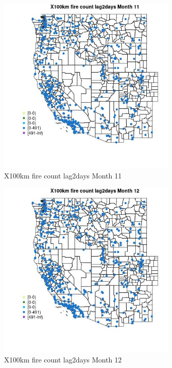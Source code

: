 \begin{figure} 
\centering  
\includegraphics[width=0.77\textwidth]{Code_Outputs/Report_ML_input_PM25_Step4_part_e_de_duplicated_aves_compiled_2019-05-14wNAs_MapObsMo11X100km_fire_count_lag2days.jpg} 
\caption{\label{fig:Report_ML_input_PM25_Step4_part_e_de_duplicated_aves_compiled_2019-05-14wNAsMapObsMo11X100km_fire_count_lag2days}X100km fire count lag2days Month 11} 
\end{figure} 
 

\begin{figure} 
\centering  
\includegraphics[width=0.77\textwidth]{Code_Outputs/Report_ML_input_PM25_Step4_part_e_de_duplicated_aves_compiled_2019-05-14wNAs_MapObsMo12X100km_fire_count_lag2days.jpg} 
\caption{\label{fig:Report_ML_input_PM25_Step4_part_e_de_duplicated_aves_compiled_2019-05-14wNAsMapObsMo12X100km_fire_count_lag2days}X100km fire count lag2days Month 12} 
\end{figure} 
 

